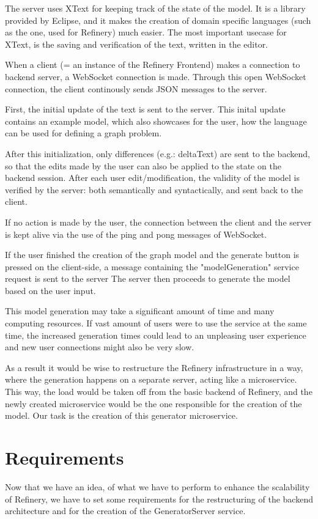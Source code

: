 	The server uses XText for keeping track of the state of the model. It is a library provided
	by Eclipse, and it makes the creation of domain specific languages (such as the one, used for Refinery)
	much easier. The most important usecase for XText, is the saving and verification of the text, 
	written in the editor.

	When a client (= an instance of the Refinery Frontend) makes a connection to backend server, a WebSocket 
	connection is made. Through this open WebSocket connection, the client continously sends JSON messages to
	the server.

	First, the initial update of the text is sent to the server.
	This inital update contains an example model, which also showcases for the user, how the language can be used
	for defining a graph problem. 
	
	After this initialization, only differences (e.g.: deltaText) are sent to the backend, so that 
	the edits made by the user can also be applied to the state on the backend session. 
	After each user edit/modification, the
	validity of the model is verified by the server: both semantically and syntactically, and sent back to the client.

	If no action is made by the user, the connection between the client and the server
	is kept alive via the use of the ping and pong messages of WebSocket.

	If the user finished the creation of the graph model and the generate button is pressed 
	on the client-side, a message containing the "modelGeneration" service request is sent to the server 
	The server then proceeds to generate the model based on the user input.

	This model generation may take a significant amount of time and many computing resources. 
	If vast amount of users were to use 
	the service at the same time, the increased generation times could lead to an unpleasing user experience and 
	new user connections might also be very slow. 
	
	As a result it would be wise to restructure the Refinery infrastructure in a way, 
	where the generation happens on a separate server,
	acting like a microservice. This way, the load would be taken off from 
	the basic backend of Refinery, and the newly created microservice would be the one responsible for
	the creation of the model.
	Our task is the creation of this generator microservice.

\section{Requirements}
Now that we have an idea, of what we have to perform to enhance the scalability of Refinery, we have to set some requirements for the
restructuring of the backend architecture and for the creation of the GeneratorServer service. 

